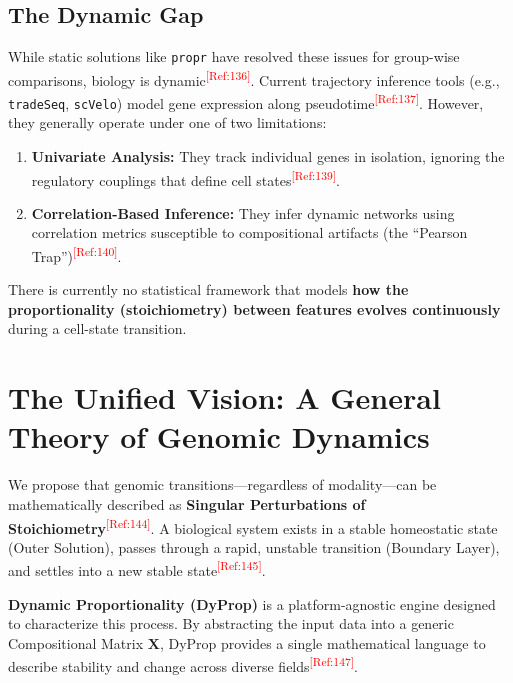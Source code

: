 \documentclass[11pt, a4paper]{article}
\newcommand{\tref}[1]{\textsuperscript{\textcolor{red}{[Ref:#1]}}}
\begin{document}
\subsection{The Dynamic Gap}
While static solutions like \texttt{propr} have resolved these issues for group-wise comparisons, biology is dynamic\tref{136}. Current trajectory inference tools (e.g., \texttt{tradeSeq}, \texttt{scVelo}) model gene expression along pseudotime\tref{137}. However, they generally operate under one of two limitations:
\begin{enumerate}
    \item \textbf{Univariate Analysis:} They track individual genes in isolation, ignoring the regulatory couplings that define cell states\tref{139}.
    \item \textbf{Correlation-Based Inference:} They infer dynamic networks using correlation metrics susceptible to compositional artifacts (the ``Pearson Trap'')\tref{140}.
\end{enumerate}

There is currently no statistical framework that models \textbf{how the proportionality (stoichiometry) between features evolves continuously} during a cell-state transition.

\section{The Unified Vision: A General Theory of Genomic Dynamics}

We propose that genomic transitions---regardless of modality---can be mathematically described as \textbf{Singular Perturbations of Stoichiometry}\tref{144}. A biological system exists in a stable homeostatic state (Outer Solution), passes through a rapid, unstable transition (Boundary Layer), and settles into a new stable state\tref{145}.

\textbf{Dynamic Proportionality (DyProp)} is a platform-agnostic engine designed to characterize this process. By abstracting the input data into a generic Compositional Matrix $\mathbf{X}$, DyProp provides a single mathematical language to describe stability and change across diverse fields\tref{147}.
\end{document}

